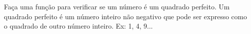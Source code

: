 
\question[10]

Faça uma função para verificar se um número é um quadrado perfeito. Um quadrado perfeito é um número inteiro não negativo que pode ser expresso como o quadrado de outro número inteiro. Ex: 1, 4, 9...